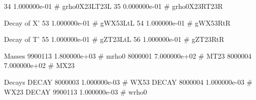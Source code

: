    34 1.000000e-01 # grho0X23LT23L 
   35 0.000000e-01 # grho0X23RT23R 

Decay of X'
   53 1.000000e-01 # gWX53LtL 
   54 1.000000e-01 # gWX53RtR 
   
Decay of T'   
   55 1.000000e-01 # gZT23LtL 
   56 1.000000e-01 # gZT23RtR 

Masses
  9900113 1.800000e+03 # mrho0 
  8000001 7.000000e+02 # MT23 
  8000004 7.000000e+02 # MX23 
  
Decays  
DECAY 8000003 1.000000e-03 # WX53 
DECAY 8000004 1.000000e-03 # WX23 
DECAY 9900113 1.000000e-03 # wrho0 
